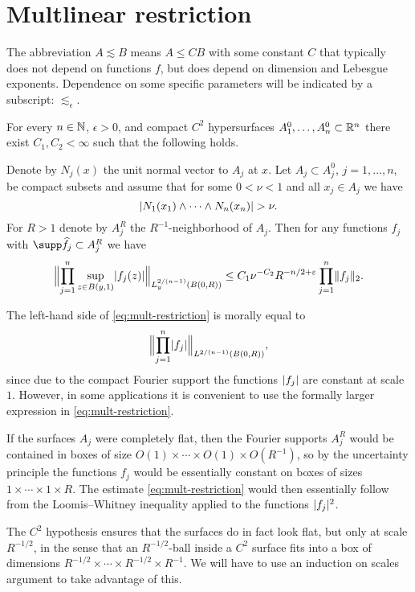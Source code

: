 \section{Multlinear restriction}
The abbreviation $A \lesssim B$ means $A \leq C B$ with some constant $C$ that typically does not depend on functions $f$, but does depend on dimension and Lebesgue exponents.
Dependence on some specific parameters will be indicated by a subscript: $\lesssim_{\epsilon}$.
\begin{theorem}[{\cite{MR2275834}}]\label{thm:mult-restriction}
For every $n\in\N$, $\epsilon>0$, and compact $C^{2}$ hypersurfaces $A_{1}^{0},\dotsc,A_{n}^{0} \subset \R^{n}$ there exist $C_{1},C_{2}<\infty$ such that the following holds.

Denote by $N_{j}(x)$ the unit normal vector to $A_{j}$ at $x$.
Let $A_{j} \subset A_{j}^{0}$, $j=1,\dotsc,n$, be compact subsets and assume that for some $0 < \nu < 1$ and all $x_{j} \in A_{j}$ we have
\[
\abs{ N_{1}(x_{1}) \wedge \dotsb \wedge N_{n}(x_{n}) } > \nu.
\]
For $R>1$ denote by $A_{j}^{R}$ the $R^{-1}$-neighborhood of $A_{j}$.
Then for any functions $f_{j}$ with $\supp \widehat{f_{j}} \subset A_{j}^{R}$ we have
\begin{equation}\label{eq:mult-restriction}
\norm[\Big]{\prod_{j=1}^{n} \sup_{z \in B(y,1)}\abs{f_{j}(z)}}_{L^{2/(n-1)}_{y}(B(0,R))}
\leq C_{1} \nu^{-C_{2}}
R^{-n/2+\epsilon} \prod_{j=1}^{n}\norm{f_{j}}_{2}.
\end{equation}
\end{theorem}
The left-hand side of \eqref{eq:mult-restriction} is morally equal to
\[
\norm[\Big]{\prod_{j=1}^{n} \abs{f_{j}} }_{L^{2/(n-1)}(B(0,R))},
\]
since due to the compact Fourier support the functions $\abs{f_{j}}$ are constant at scale $1$.
However, in some applications it is convenient to use the formally larger expression in \eqref{eq:mult-restriction}.

If the surfaces $A_{j}$ were completely flat, then the Fourier supports $A_{j}^{R}$ would be contained in boxes of size $O(1) \times \dotsm \times O(1) \times O(R^{-1})$, so by the uncertainty principle the functions $f_{j}$ would be essentially constant on boxes of sizes $1 \times \dotsm \times 1 \times R$.
The estimate \eqref{eq:mult-restriction} would then essentially follow from the Loomis--Whitney inequality applied to the functions $\abs{f_{j}}^{2}$.

The $C^{2}$ hypothesis ensures that the surfaces do in fact look flat, but only at scale $R^{-1/2}$, in the sense that an $R^{-1/2}$-ball inside a $C^{2}$ surface fits into a box of dimensions $R^{-1/2} \times \dotsm \times R^{-1/2} \times R^{-1}$.
We will have to use an induction on scales argument to take advantage of this.


